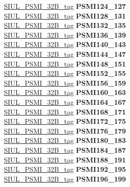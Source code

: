 \begin{DoxyCompactItemize}
\begin{tabbing}
\>\>\mbox{\hyperlink{unionSIUL__PSMI__32B__tag}{SIUL\_PSMI\_32B\_tag}} {\bfseries PSMI124\_127}\\
\>\>\mbox{\hyperlink{unionSIUL__PSMI__32B__tag}{SIUL\_PSMI\_32B\_tag}} {\bfseries PSMI128\_131}\\
\>\>\mbox{\hyperlink{unionSIUL__PSMI__32B__tag}{SIUL\_PSMI\_32B\_tag}} {\bfseries PSMI132\_135}\\
\>\>\mbox{\hyperlink{unionSIUL__PSMI__32B__tag}{SIUL\_PSMI\_32B\_tag}} {\bfseries PSMI136\_139}\\
\>\>\mbox{\hyperlink{unionSIUL__PSMI__32B__tag}{SIUL\_PSMI\_32B\_tag}} {\bfseries PSMI140\_143}\\
\>\>\mbox{\hyperlink{unionSIUL__PSMI__32B__tag}{SIUL\_PSMI\_32B\_tag}} {\bfseries PSMI144\_147}\\
\>\>\mbox{\hyperlink{unionSIUL__PSMI__32B__tag}{SIUL\_PSMI\_32B\_tag}} {\bfseries PSMI148\_151}\\
\>\>\mbox{\hyperlink{unionSIUL__PSMI__32B__tag}{SIUL\_PSMI\_32B\_tag}} {\bfseries PSMI152\_155}\\
\>\>\mbox{\hyperlink{unionSIUL__PSMI__32B__tag}{SIUL\_PSMI\_32B\_tag}} {\bfseries PSMI156\_159}\\
\>\>\mbox{\hyperlink{unionSIUL__PSMI__32B__tag}{SIUL\_PSMI\_32B\_tag}} {\bfseries PSMI160\_163}\\
\>\>\mbox{\hyperlink{unionSIUL__PSMI__32B__tag}{SIUL\_PSMI\_32B\_tag}} {\bfseries PSMI164\_167}\\
\>\>\mbox{\hyperlink{unionSIUL__PSMI__32B__tag}{SIUL\_PSMI\_32B\_tag}} {\bfseries PSMI168\_171}\\
\>\>\mbox{\hyperlink{unionSIUL__PSMI__32B__tag}{SIUL\_PSMI\_32B\_tag}} {\bfseries PSMI172\_175}\\
\>\>\mbox{\hyperlink{unionSIUL__PSMI__32B__tag}{SIUL\_PSMI\_32B\_tag}} {\bfseries PSMI176\_179}\\
\>\>\mbox{\hyperlink{unionSIUL__PSMI__32B__tag}{SIUL\_PSMI\_32B\_tag}} {\bfseries PSMI180\_183}\\
\>\>\mbox{\hyperlink{unionSIUL__PSMI__32B__tag}{SIUL\_PSMI\_32B\_tag}} {\bfseries PSMI184\_187}\\
\>\>\mbox{\hyperlink{unionSIUL__PSMI__32B__tag}{SIUL\_PSMI\_32B\_tag}} {\bfseries PSMI188\_191}\\
\>\>\mbox{\hyperlink{unionSIUL__PSMI__32B__tag}{SIUL\_PSMI\_32B\_tag}} {\bfseries PSMI192\_195}\\
\>\>\mbox{\hyperlink{unionSIUL__PSMI__32B__tag}{SIUL\_PSMI\_32B\_tag}} {\bfseries PSMI196\_199}\\

\end{tabbing}
\end{DoxyCompactItemize}
